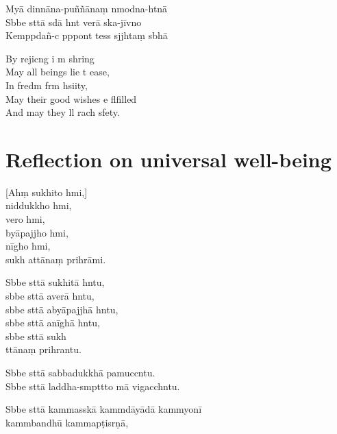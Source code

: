 Myā dinnāna-puññānaṃ nmodna-htnā\\
Sbbe sttā sdā hnt verā ska-jīvno\\
Kemppdañ-c pppont tess sjjhtaṃ sbhā

\begin{english}
  By rejicng i m shring\\
  May all beings lie t ease,\\
  In fredm frm hsiity,\\
  May their good wishes e flfilled\\
  And may they ll rach sfety.
\end{english}

\clearpage

\chapter[Universal well-being]{Reflection on universal well-being}%

\begin{leader}
\end{leader}

[Ahṃ sukhito hmi,]\\
niddukkho hmi,\\
vero hmi,\\
byāpajjho hmi,\\
nīgho hmi,\\
sukh attānaṃ prihrāmi.

Sbbe sttā sukhitā hntu,\\
sbbe sttā averā hntu,\\
sbbe sttā abyāpajjhā hntu,\\
sbbe sttā anīghā hntu,\\
sbbe sttā sukh\\
ttānaṃ prihrantu.

Sbbe sttā sabbadukkhā pamuccntu.\\
Sbbe sttā laddha-smpttto mā vigacchntu.

Sbbe sttā kammasskā kammdāyādā kammyonī\\
\vin kammbandhū kammapṭisrṇā,

